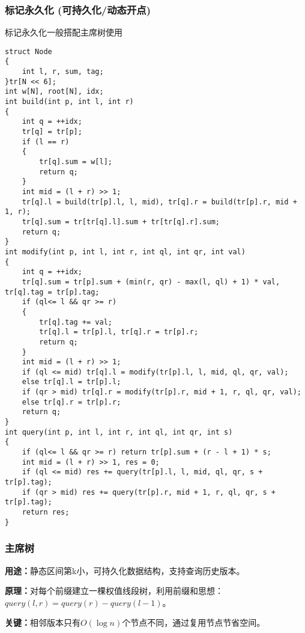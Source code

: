 \documentclass[a4paper, fontset=none]{ctexart}
\begin{document}
\subsubsection{标记永久化 (可持久化/动态开点)}
标记永久化一般搭配主席树使用
\begin{verbatim}
struct Node
{
    int l, r, sum, tag;
}tr[N << 6];
int w[N], root[N], idx;
int build(int p, int l, int r)
{
    int q = ++idx;
    tr[q] = tr[p];
    if (l == r)
    {
        tr[q].sum = w[l];
        return q;
    }
    int mid = (l + r) >> 1;
    tr[q].l = build(tr[p].l, l, mid), tr[q].r = build(tr[p].r, mid + 1, r);
    tr[q].sum = tr[tr[q].l].sum + tr[tr[q].r].sum;
    return q;
}
int modify(int p, int l, int r, int ql, int qr, int val)
{
    int q = ++idx;
    tr[q].sum = tr[p].sum + (min(r, qr) - max(l, ql) + 1) * val, tr[q].tag = tr[p].tag;
    if (ql<= l && qr >= r)
    {
        tr[q].tag += val;
        tr[q].l = tr[p].l, tr[q].r = tr[p].r;
        return q;
    }
    int mid = (l + r) >> 1;
    if (ql <= mid) tr[q].l = modify(tr[p].l, l, mid, ql, qr, val);
    else tr[q].l = tr[p].l;
    if (qr > mid) tr[q].r = modify(tr[p].r, mid + 1, r, ql, qr, val);
    else tr[q].r = tr[p].r;
    return q;
}
int query(int p, int l, int r, int ql, int qr, int s)
{
    if (ql<= l && qr >= r) return tr[p].sum + (r - l + 1) * s;
    int mid = (l + r) >> 1, res = 0;
    if (ql <= mid) res += query(tr[p].l, l, mid, ql, qr, s + tr[p].tag);
    if (qr > mid) res += query(tr[p].r, mid + 1, r, ql, qr, s + tr[p].tag);
    return res;
}
\end{verbatim}
\subsubsection{主席树}
\textbf{用途：}静态区间第k小，可持久化数据结构，支持查询历史版本。

\textbf{原理：}对每个前缀建立一棵权值线段树，利用前缀和思想：$query(l, r) = query(r) - query(l-1)$。

\textbf{关键：}相邻版本只有$O(\log n)$个节点不同，通过复用节点节省空间。
\end{document}
